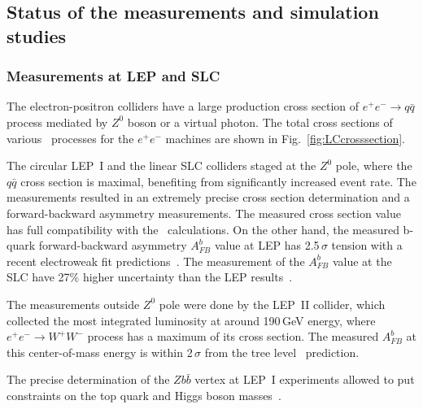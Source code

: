 %
\subsection{Status of the measurements and simulation studies}

\subsubsection{Measurements at LEP and SLC}
The electron-positron colliders have a large production cross section of $e^+e^- \to q\bar{q}$ process mediated by $Z^0$ boson or a virtual photon. The total cross sections of various \sm\ processes for the $e^+e^-$ machines are shown in Fig.~\ref{fig:LCcrosssection}.

The circular LEP~I and the linear SLC colliders staged at the $Z^0$ pole, where the $q\bar{q}$ cross section is maximal, benefiting from significantly increased event rate. 
The measurements resulted in an extremely precise cross section determination and a forward-backward asymmetry measurements. 
The measured cross section value has full compatibility with the \sm\ calculations. 
On the other hand, the measured b-quark forward-backward asymmetry $A_{FB}^b$  value at LEP has 2.5\,$\sigma$ tension with a recent electroweak fit predictions~\cite{bib:AfbSMFit}.
The measurement of the $A_{FB}^b$ value at the SLC have 27\% higher uncertainty than the LEP results~\cite{bib:SLC}.

The measurements outside $Z^0$ pole were done by the LEP~II collider, which collected the most integrated luminosity at around 190\,GeV energy, where $e^+e^- \to W^+W^-$ process has a maximum of its cross section.
The measured $A_{FB}^b$ at this center-of-mass energy is within 2\,$\sigma$ from the tree level \sm\ prediction.

The precise determination of the $Zb\bar{b}$ vertex at LEP~I experiments allowed to put constraints on the top quark and Higgs boson masses~\cite{bib:LEPTOP}.

